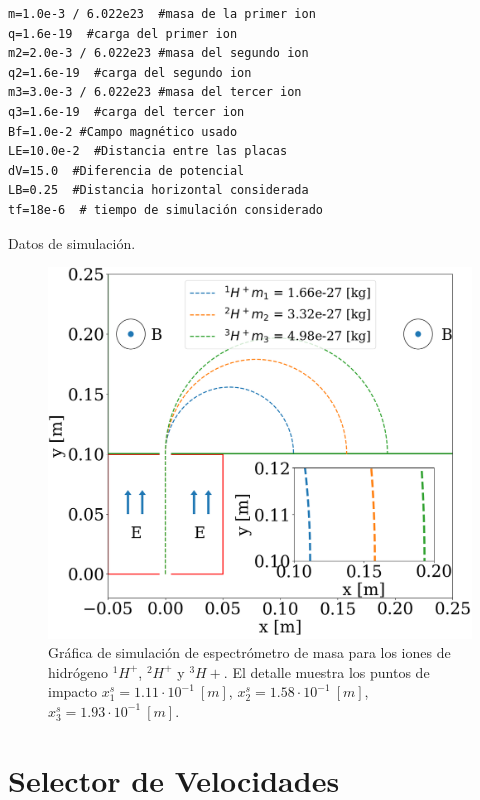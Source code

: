 \documentclass[journal]{IEEEtran}
\newenvironment{code}{\captionsetup{type=listing}}{\par\addvspace{\baselineskip}}
\begin{document}
\bigskip

\begin{code}
    \begin{verbatim}
m=1.0e-3 / 6.022e23  #masa de la primer ion
q=1.6e-19  #carga del primer ion
m2=2.0e-3 / 6.022e23 #masa del segundo ion
q2=1.6e-19  #carga del segundo ion
m3=3.0e-3 / 6.022e23 #masa del tercer ion
q3=1.6e-19  #carga del tercer ion
Bf=1.0e-2 #Campo magnético usado
LE=10.0e-2  #Distancia entre las placas
dV=15.0  #Diferencia de potencial
LB=0.25  #Distancia horizontal considerada
tf=18e-6  # tiempo de simulación considerado 
    \end{verbatim}
    \caption{Datos de simulación.}
    \label{listing:datos_espectrometro}
\end{code}

\begin{figure}[!htb]
    \includegraphics[width=\linewidth]{espectrometro_simulacion}
    \caption{Gráfica de simulación de espectrómetro de masa para los iones de hidrógeno $^1H^+$, $^2H^+$ y $^3H+$. El detalle muestra los puntos de impacto $x^s_1 = 1.11\cdot 10^{-1}~[m]$, $x^s_2 = 1.58\cdot 10^{-1}~[m]$, $x^s_3 = 1.93\cdot 10^{-1}~[m]$.}
    \label{fig:espectrometro_simulacion}
\end{figure}

\newpage

\section{Selector de Velocidades}
\label{sec:selector}
\end{document}
